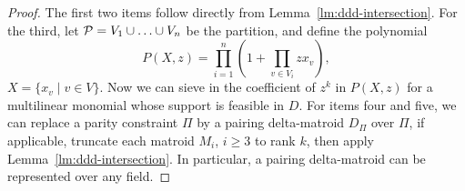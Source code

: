 %

\dmponefpt*

\begin{proof}
  The first two items follow directly from Lemma~\ref{lm:ddd-intersection}.
  For the third, let $\mathcal P=V_1 \cup \ldots \cup V_n$ be the partition, 
  and define the polynomial
  \[
    P(X,z) = \prod_{i=1}^n (1+\prod_{v \in V_i} zx_v),
  \]
  $X=\{x_v \mid v \in V\}$. Now we can sieve in the coefficient of $z^k$ in $P(X,z)$ for
  a multilinear monomial whose support is feasible in $D$. 
  For items four and five, we can replace a parity constraint $\Pi$ by
  a pairing delta-matroid $D_\Pi$ over $\Pi$, if applicable,
  truncate each matroid $M_i$, $i \geq 3$ to rank $k$, then apply Lemma~\ref{lm:ddd-intersection}.
  In particular, a pairing delta-matroid can be represented over any field. 
\end{proof}

